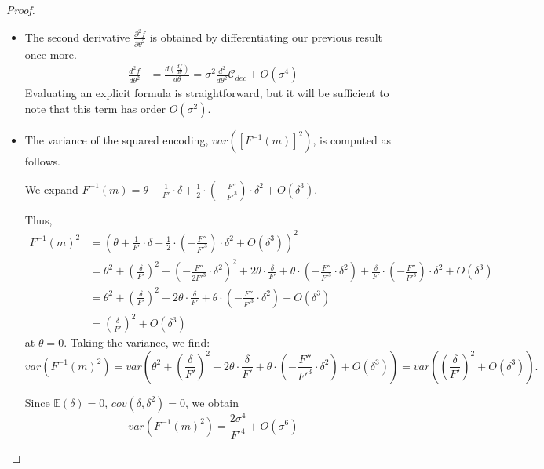 \begin{proof}
\begin{itemize}
    

    \item The second derivative {$\frac{\partial^2 f}{\partial \theta^2}$} is obtained by differentiating our previous result once more.
    \begin{align*}
        \frac{d^2f}{d\theta^2} &= \frac{d (\frac{df}{d\theta})}{d\theta} = \sigma^2 \frac{d^2}{d\theta^2} \mathcal{C}_{dec} + O(\sigma^4)
    \end{align*}
Evaluating an explicit formula is straightforward, but it will be sufficient to note that this term has order $O(\sigma^2)$.

    \item The variance of the squared encoding, {$var([F^{-1}(m)]^2)$}, is computed as follows.


    
    We expand $F^{-1}(m) = \theta + \frac{1}{F'} \cdot \delta + \frac{1}{2} \cdot (-\frac{F''}{F'^3}) \cdot \delta^2 + O(\delta^3)$.

    
    Thus,
    \begin{align*}
        F^{-1}(m)^2 &= \left(\theta + \frac{1}{F'} \cdot \delta + \frac{1}{2} \cdot (-\frac{F''}{F'^3}) \cdot \delta^2 + O(\delta^3)\right)^2\\
        &=\theta^2 + \left(\frac{\delta}{F'}\right)^2 + \left(-\frac{F''}{2F'^3} \cdot \delta^2\right)^2 + 2\theta \cdot \frac{\delta}{F'} + \theta \cdot \left(-\frac{F''}{F'^3} \cdot \delta^2\right) + \frac{\delta}{F'} \cdot \left(-\frac{F''}{F'^3}\right) \cdot \delta^2 + O(\delta^3)\\
        &=\theta^2 + \left(\frac{\delta}{F'}\right)^2 + 2\theta \cdot \frac{\delta}{F'} + \theta \cdot \left(-\frac{F''}{F'^3} \cdot \delta^2\right) + O(\delta^3)\\
        &= \left(\frac{\delta}{F'}\right)^2 + O(\delta^3)
    \end{align*}
    at $\theta=0$.
    Taking the variance, we find:
    \begin{equation}
    var\left(F^{-1}(m)^2\right) = var\left(\theta^2 + \left(\frac{\delta}{F'}\right)^2 + 2\theta \cdot \frac{\delta}{F'} + \theta \cdot \left(-\frac{F''}{F'^3} \cdot \delta^2\right) + O(\delta^3)\right)=var\left(\left(\frac{\delta}{F'}\right)^2 + O(\delta^3)\right).
    \end{equation}
    
    Since  $\mathbb{E}(\delta) = 0$, $cov(\delta, \delta^2) = 0$, we obtain
    \begin{equation}
    var(F^{-1}(m)^2)=\frac{2\sigma^4}{F'^4} + O(\sigma^6)
    \end{equation}
    

\end{itemize}
\end{proof}
